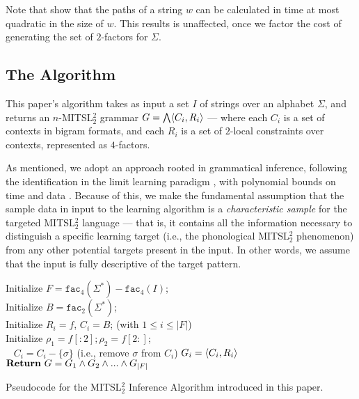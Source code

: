 \documentclass[11pt,a4paper]{article}
\newcommand{\facn}[1]{\ensuremath{\texttt{fac}_{#1}}}
\begin{document}
Note that  \citet{JardineHeinz16} show that the paths of a string $w$ can be calculated in time at most quadratic in the size of $w$.\@
This results is unaffected, once we factor the cost of generating the set of $2$-factors for $\Sigma$.


\subsection{The Algorithm}

This paper's algorithm  takes as input a set $I$ of strings over an alphabet $\Sigma$, and returns an $n$-MITSL$^2_2$ grammar $G=\bigwedge\langle{C_i,R_i}\rangle$ --- where each $C_i$ is a set of contexts in bigram formats, and each $R_i$ is a set of $2$-local constraints over contexts, represented as $4$-factors.

As mentioned, we adopt an approach rooted in grammatical inference, following the identification in the limit learning paradigm \cite{gold1967language}, with polynomial bounds on time and data \cite{de2010grammatical}.\@
Because of this, we make the fundamental assumption that the sample data in input to the learning algorithm is a \emph{characteristic sample} for the targeted MITSL$^2_2$  language --- that is, it contains all the information necessary to distinguish a specific learning target (i.e., the phonological MITSL$^2_2$ phenomenon) from any other potential targets present in the input.
In other words, we assume that the input is fully descriptive of the target pattern.
\begin{algorithm}[!ht]
    Initialize $F=\facn{4}(\Sigma^*)-\facn{4}(I)$; \\
    Initialize $B=\facn{2}(\Sigma^*)$; \\
        	{
            Initialize $R_i=f$, $C_i=B$; (with $1 \leq i \leq  |F|$) \\
             Initialize $\rho_1 = f[:2] ;\rho_2 = f[2:]$;\\
            	{
                	~
    					{$C_i=C_i-\{\sigma\}$ (i.e., remove $\sigma$ from $C_i$)}}
					$G_i=\langle{C_i,R_i}\rangle$
                }
            $\mathbf{Return}\textnormal{ }G=G_1\wedge G_2\wedge ... \wedge G_{|F|}$
            \medskip
	\caption{Pseudocode for the MITSL$^2_2$ Inference Algorithm introduced in this paper.}
\end{algorithm}
\end{document}
